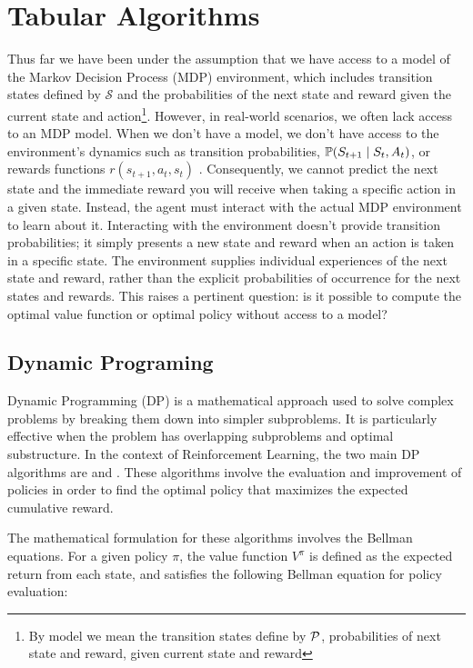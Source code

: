 \section{Tabular Algorithms}\label{Algo}



Thus far we have been under the assumption that we have access to a model of the Markov Decision Process (MDP) environment, which includes transition states defined by $\mathcal{S}$ and the probabilities of the next state and reward given the current state and action\footnote{By model we mean the transition states define by $\mathcal P$, probabilities of next state and reward, given current state and reward}.
However, in real-world scenarios, we often lack access to an MDP model. 
When we don't have a model, we don't have access to the environment's dynamics such as transition probabilities, $\mathbb P(S_{t+1} \mid S_t , A_t)$, or rewards functions $r(s_{t+1}, a_t, s_t)$ . Consequently, we cannot predict the next state and the immediate reward you will receive when taking a specific action in a given state. 
Instead, the agent must interact with the actual MDP environment to learn about it. Interacting with the environment doesn't provide transition probabilities; it simply presents a new state and reward when an action is taken in a specific state. The environment supplies individual experiences of the next state and reward, rather than the explicit probabilities of occurrence for the next states and rewards. This raises a pertinent question: is it possible to compute the optimal value function or optimal policy without access to a model?



\subsection{Dynamic Programing}
Dynamic Programming (DP) is a mathematical approach used to solve complex problems by breaking them down into simpler subproblems. It is particularly effective when the problem has overlapping subproblems and optimal substructure. In the context of Reinforcement Learning, the two main DP algorithms are  and . These algorithms involve the evaluation and improvement of policies in order to find the optimal policy that maximizes the expected cumulative reward.


The mathematical formulation for these algorithms involves the Bellman equations. For a given policy $\pi$, the value function $V^\pi$ is defined as the expected return from each state, and satisfies the following Bellman equation for policy evaluation:

